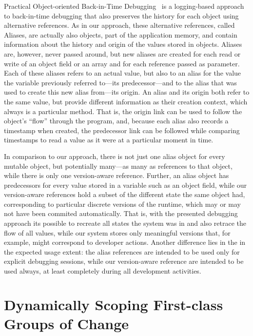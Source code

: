 Practical Object-oriented Back-in-Time Debugging~\cite{Lienhard2008POB} is a logging-based approach to back-in-time debugging that also preserves the history for each object using alternative references.
As in our approach, these alternative references, called Aliases, are actually also objects, part of the application memory, and contain information about the history and origin of the values stored in objects.
Aliases are, however, never passed around, but new aliases are created for each read or write of an object field or an array and for each reference passed as parameter.
Each of these aliases refers to an actual value, but also to an alias for the value the variable previously referred to---its predecessor---and to the alias that was used to create this new alias from---its origin.
An alias and its origin both refer to the same value, but provide different information as their creation context, which always is a particular method.
That is, the origin link can be used to follow the object's ``flow'' through the program, and, because each alias also records a timestamp when created, the predecessor link can be followed while comparing timestamps to read a value as it were at a particular moment in time.

In comparison to our approach, there is not just one alias object for every mutable object, but potentially many---as many as references to that object, while there is only one version-aware reference.
Further, an alias object has predecessors for every value stored in a variable such as an object field, while our version-aware references hold a subset of the different state the same object had, corresponding to particular discrete versions of the runtime, which may or may not have been commited automatically.
That is, with the presented debugging approach its possible to recreate all states the system was in and also retrace the flow of all values, while our system stores only meaningful versions that, for example, might correspond to developer actions.
Another difference lies in the in the expected usage extent: the alias references are intended to be used only for explicit debugging sessions, while our version-aware reference are intended to be used always, at least completely during all development activities.






\section{Dynamically Scoping First-class Groups of Change}

